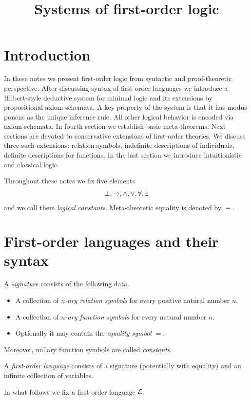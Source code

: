 \documentclass[10pt]{amsart}
\begin{document}
\title{Systems of first-order logic}
\date{}
\maketitle

\section{Introduction}
\noindent
In these notes we present first-order logic from syntactic and proof-theoretic perspective. After discussing syntax of first-order languages we introduce a Hilbert-style deductive system for minimal logic and its extensions by propositional axiom schemata. A key property of the system is that it has modus ponens as the unique inference rule. All other logical behavior is encoded via axiom schemata. In fourth section we establish basic meta-theorems. Next sections are devoted to conservative extensions of first-order theories. We discuss three such extensions: relation symbols, indefinite descriptions of individuals, definite descriptions for functions. In the last section we introduce intuitionistic and classical logic.  

Throughout these notes we fix five elements
$$\perp, \rightarrow, \wedge, \vee, \forall, \exists$$
and we call them \textit{logical constants}. Meta-theoretic equality is denoted by $\equiv$.

\section{First-order languages and their syntax}

\begin{definition}
	A \textit{signature} consists of the following data.
	\begin{itemize}
		\item A collection of \textit{$n$-ary relation symbols} for every positive natural number $n$.
		\item A collection of \textit{$n$-ary function symbols} for every natural number $n$.
		\item Optionally it may contain the \textit{equality symbol} $=$.
	\end{itemize}
	Moreover, nullary function symbols are called \textit{constants}.
\end{definition}

\begin{definition}
	A \textit{first-order language} consists of a signature (potentially with equality) and an infinite collection of variables.
\end{definition}
\noindent
In what follows we fix a first-order language ${\mathcal L}$.
\end{document}
